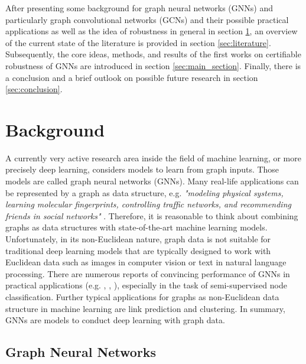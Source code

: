 \documentclass[a4paper,preprint]{sig-alternate}
\begin{document}
After presenting some background for graph neural networks (GNNs) and particularly graph convolutional networks (GCNs)
and their possible practical applications as well as the idea of robustness in general in section \ref{sec:background}, 
an overview of the current state of the literature is provided in section \ref{sec:literature}. Subsequently, the core ideas,
methods, and results of the first works on certifiable robustness of GNNs are introduced in section \ref{sec:main_section}.
Finally, there is a conclusion and a brief outlook on possible future research in section \ref{sec:conclusion}.

\section{Background}
\label{sec:background}

A currently very active research area inside the field of machine learning, or more precisely deep learning, considers models to learn
from graph inputs. Those models are called graph neural networks (GNNs). 
Many real-life applications can be represented by a graph as data structure, e.g. \textit{"modeling physical systems, learning molecular fingerprints,
controlling traffic networks, and recommending friends in social networks"} \cite{Liu_2020}. 
Therefore, it is reasonable to think about combining graphs as data structures with state-of-the-art machine learning models.
Unfortunately, in its non-Euclidean nature, graph data is not suitable for traditional deep learning models that are typically designed 
to work with Euclidean data such as images in computer vision or text in natural language processing. \cite{Liu_2020}
There are numerous reports of convincing performance of GNNs in practical applications (e.g. \cite{NIPS2015_f9be311e},
\cite{hamilton2018inductive}, \cite{trivedi2017knowevolve}), especially in the task of semi-supervised node classification. \cite{xu2019topology}
Further typical applications for graphs as non-Euclidean data structure in machine learning are link prediction and clustering. \cite{Zhou_2019}
In summary, GNNs are models to conduct deep learning with graph data.\newline

\subsection{Graph Neural Networks}
\end{document}
